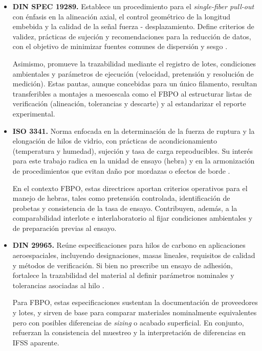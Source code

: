 \begin{itemize}
    \item \textbf{DIN SPEC 19289.} Establece un procedimiento para el \textit{single-fiber pull-out}
    con énfasis en la alineación axial, el control geométrico de la longitud embebida y la calidad de
    la señal fuerza - desplazamiento. Define criterios de validez, prácticas de sujeción y
    recomendaciones para la reducción de datos, con el objetivo de minimizar fuentes comunes de
    dispersión y sesgo \cite{DINSPEC19289}. 

    Asimismo, promueve la trazabilidad mediante el registro de lotes, condiciones ambientales y
    parámetros de ejecución (velocidad, pretensión y resolución de medición). Estas pautas, aunque
    concebidas para un único filamento, resultan transferibles a montajes a mesoescala como el FBPO
    al estructurar listas de verificación (alineación, tolerancias y descarte) y al estandarizar el
    reporte experimental.

    \item \textbf{ISO 3341.} Norma enfocada en la determinación de la fuerza de ruptura y la elongación
    de hilos de vidrio, con prácticas de acondicionamiento (temperatura y humedad), sujeción y tasa
    de carga reproducibles. Su interés para este trabajo radica en la unidad de ensayo (hebra) y en
    la armonización de procedimientos que evitan daño por mordazas o efectos de borde \cite{ISO3341}. 

    En el contexto FBPO, estas directrices aportan criterios operativos para el manejo de hebras,
    tales como pretensión controlada, identificación de probetas y consistencia de la tasa de
    ensayo. Contribuyen, además, a la comparabilidad interlote e interlaboratorio al fijar
    condiciones ambientales y de preparación previas al ensayo.

    \item \textbf{DIN 29965.} Reúne especificaciones para hilos de carbono en aplicaciones
    aeroespaciales, incluyendo designaciones, masas lineales, requisitos de calidad y métodos de
    verificación. Si bien no prescribe un ensayo de adhesión, fortalece la trazabilidad del material
    al definir parámetros nominales y tolerancias asociadas al hilo \cite{DIN29965}. 

    Para FBPO, estas especificaciones sustentan la documentación de proveedores y lotes, y sirven de
    base para comparar materiales nominalmente equivalentes pero con posibles diferencias de
    \textit{sizing} o acabado superficial. En conjunto, refuerzan la consistencia del muestreo y la
    interpretación de diferencias en IFSS aparente.


\end{itemize}
